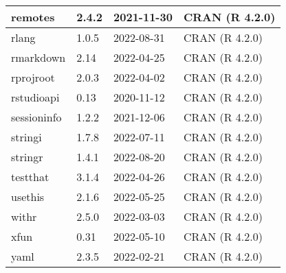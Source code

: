 \documentclass[
]{book}
\theoremstyle{definition}
\theoremstyle{definition}
\theoremstyle{definition}
\theoremstyle{definition}
\theoremstyle{remark}
\begin{document}
\begin{tabular}{l|l|l|l}
\hline
remotes & 2.4.2 & 2021-11-30 & CRAN (R 4.2.0)\\
\hline
rlang & 1.0.5 & 2022-08-31 & CRAN (R 4.2.0)\\
\hline
rmarkdown & 2.14 & 2022-04-25 & CRAN (R 4.2.0)\\
\hline
rprojroot & 2.0.3 & 2022-04-02 & CRAN (R 4.2.0)\\
\hline
rstudioapi & 0.13 & 2020-11-12 & CRAN (R 4.2.0)\\
\hline
sessioninfo & 1.2.2 & 2021-12-06 & CRAN (R 4.2.0)\\
\hline
stringi & 1.7.8 & 2022-07-11 & CRAN (R 4.2.0)\\
\hline
stringr & 1.4.1 & 2022-08-20 & CRAN (R 4.2.0)\\
\hline
testthat & 3.1.4 & 2022-04-26 & CRAN (R 4.2.0)\\
\hline
usethis & 2.1.6 & 2022-05-25 & CRAN (R 4.2.0)\\
\hline
withr & 2.5.0 & 2022-03-03 & CRAN (R 4.2.0)\\
\hline
xfun & 0.31 & 2022-05-10 & CRAN (R 4.2.0)\\
\hline
yaml & 2.3.5 & 2022-02-21 & CRAN (R 4.2.0)\\
\hline
\end{tabular}

  
\end{document}
